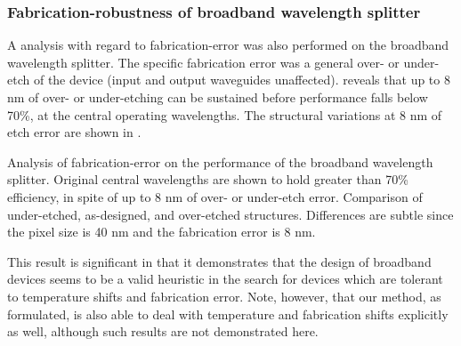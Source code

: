\subsubsection{Fabrication-robustness of broadband wavelength splitter}
A analysis with regard to fabrication-error
    was also performed on the broadband wavelength splitter.
The specific fabrication error was a general over- or under-etch
    of the device (input and output waveguides unaffected).
 reveals that up to 8 nm of over- or under-etching
    can be sustained before performance falls below 70\%, at the central
    operating wavelengths.
The structural variations at 8 nm of etch error are shown in .
    
    {Analysis of fabrication-error on the performance of the broadband 
    wavelength splitter.
    Original central wavelengths are shown to hold greater than 70\% efficiency,
    in spite of up to 8 nm of over- or under-etch error.}
    {Comparison of under-etched, as-designed, and over-etched structures.
    Differences are subtle since the pixel size is 40 nm and the
    fabrication error is 8 nm.}

This result is significant in that it demonstrates
    that the design of broadband devices
    seems to be a valid heuristic in the search for 
    devices which are tolerant to temperature shifts and fabrication error.
Note, however, that our method, as formulated, is also able to
    deal with temperature and fabrication shifts explicitly as well,
    although such results are not demonstrated here.

% 
% 
% 
